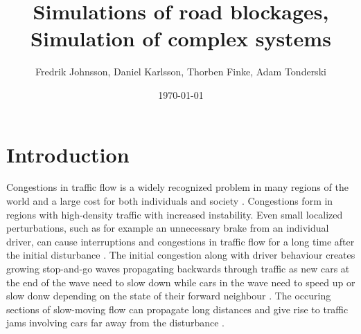 \documentclass[11pt,a4paper,twocolumn]{article}
\begin{document}
\title{Simulations of road blockages, Simulation of complex systems}
\author{Fredrik Johnsson, Daniel Karlsson, Thorben Finke, Adam Tonderski}
\date{\today}


\newpage
\tableofcontents

\section{Introduction}
Congestions in traffic flow is a widely recognized problem in many regions of the world and a large cost for both individuals and society \cite{inrix}. Congestions form in regions with high-density traffic with increased instability. Even small localized perturbations, such as for example an unnecessary brake from an individual driver, can cause interruptions and congestions in traffic flow for a long time after the initial disturbance \cite{kerner97flow, bando1995dynamical}. The initial congestion along with driver behaviour creates growing stop-and-go waves propagating backwards through traffic as new cars at the end of the wave need to slow down while cars in the wave need to speed up or slow donw depending on the state of their forward neighbour  \cite{stern17autonomous, kerner96trafficjam}. The occuring sections of slow-moving flow can propagate long distances and give rise to traffic jams involving cars far away from the disturbance \cite{kerner96trafficjam}.
\end{document}
